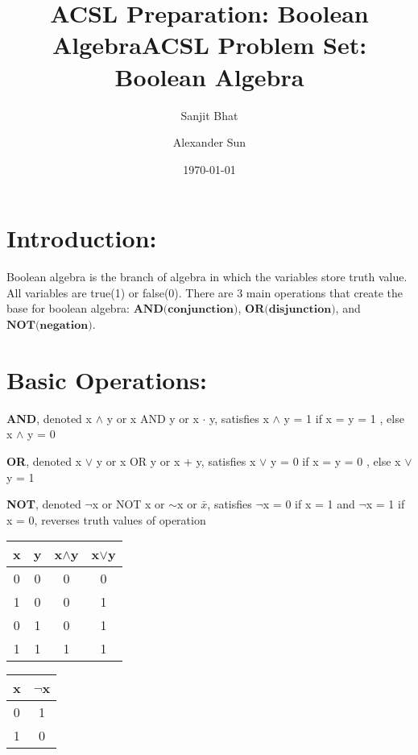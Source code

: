 \documentclass{article}
\title{ACSL Preparation: Boolean Algebra}
\author{Sanjit Bhat \and Alexander Sun}
\date{\today}
\begin{document}
\maketitle

\newpage

\begin{center}
    \title{ACSL Problem Set: Boolean Algebra}
\end{center}

\section{Introduction:}
Boolean algebra is the branch of algebra in which the variables store truth value. All variables are true(1) or false(0).
There are 3 main operations that create the base for boolean algebra: $\textbf{AND(conjunction)}$, $\textbf{OR(disjunction)}$, and $\textbf{NOT(negation)}$. 

\bigskip
\noindent
\section{Basic Operations:}
\textbf{AND}, denoted x $\land$ y or x AND y or x $\cdot$ y, satisfies x $\land$ y = 1 if x = y = 1 , else x $\land$ y = 0

\noindent
\textbf{OR}, denoted x $\lor$ y or x OR y or x + y, satisfies x $\lor$ y = 0 if x = y = 0 , else x $\lor$ y = 1

\noindent
\textbf{NOT}, denoted $\neg$x or NOT x or $\sim$x or $\bar{x}$, satisfies $\neg$x = 0 if x = 1 and $\neg$x = 1 if x = 0, reverses truth values of operation

\begin{center}
\begin{tabular}{ |c|c|c|c| } 
 \hline
 x & y & x$\land$y & x$\lor$y \\ 
 \hline
  0 & 0 & 0 & 0 \\ 
 \hline
 1 & 0 & 0 & 1 \\ 
 \hline
 0 & 1 & 0 & 1 \\ 
 \hline
 1 & 1 & 1 & 1 \\ 
 \hline
\end{tabular}
\end{center}

\begin{center}
\begin{tabular}{ |c|c| } 
 \hline
 x & $\neg$x \\ 
 \hline
  0 & 1  \\ 
 \hline
 1 & 0 \\ 
 \hline
\end{tabular}
\end{center}
\end{document}
